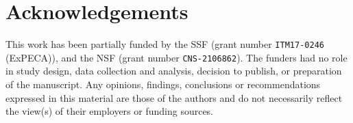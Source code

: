\section*{Acknowledgements}\label{sec:acks}

This work has been partially funded by the \gls{SSF} (grant number \verb|ITM17-0246| (ExPECA)), and the \gls{NSF} (grant number \verb|CNS-2106862|).
The funders had no role in study design, data collection and analysis, decision to publish, or preparation of the manuscript.
Any opinions, findings, conclusions or recommendations expressed in this material are those of the authors and do not necessarily reflect the view(s) of their employers or funding sources.
